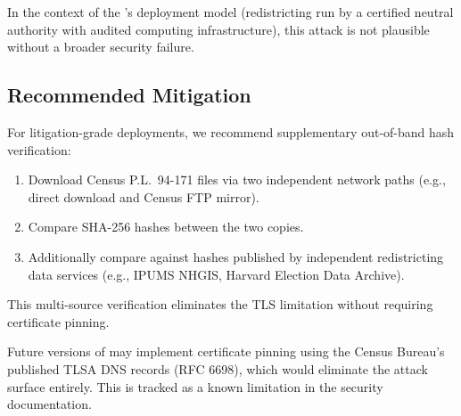 In the context of the \dia{}'s deployment model (redistricting run by
a certified neutral authority with audited computing infrastructure),
this attack is not plausible without a broader security failure.

\subsection{Recommended Mitigation}

For litigation-grade deployments, we recommend supplementary out-of-band
hash verification:
\begin{enumerate}
\item Download Census P.L.\ 94-171 files via two independent network paths
  (e.g., direct download and Census FTP mirror).
\item Compare SHA-256 hashes between the two copies.
\item Additionally compare against hashes published by independent
  redistricting data services (e.g., IPUMS NHGIS, Harvard Election Data Archive).
\end{enumerate}
This multi-source verification eliminates the TLS limitation without
requiring certificate pinning.

Future versions of \bisect{} may implement certificate pinning using the
Census Bureau's published TLSA DNS records (RFC 6698), which would
eliminate the attack surface entirely.
This is tracked as a known limitation in the \bisect{} security documentation.
